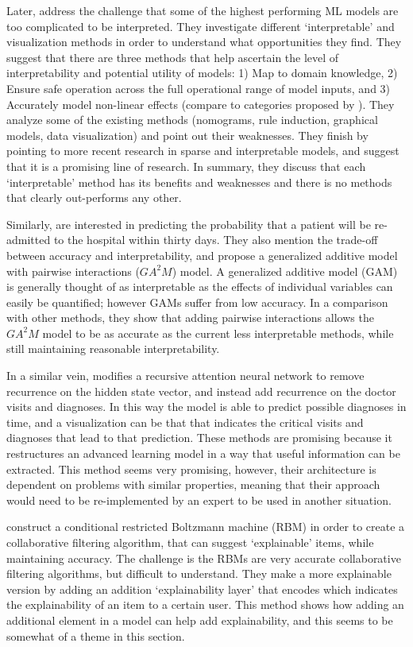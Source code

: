     Later, \citet{Van_Belle2013-ph} address the challenge that some of the highest performing ML models are too complicated to be interpreted. They investigate different `interpretable' and visualization methods in order to understand what opportunities they find. They suggest that there are three methods that help ascertain the level of interpretability and potential utility of models: 1) Map to domain knowledge, 2) Ensure safe operation across the full operational range of model inputs, and 3) Accurately model non-linear effects (compare to categories proposed by \citet{Lipton2016-ug}). They analyze some of the existing methods (nomograms, rule induction, graphical models, data visualization) and point out their weaknesses. They finish by pointing to more recent research in sparse and interpretable models, and suggest that it is a promising line of research. In summary, they discuss that each `interpretable' method has its benefits and weaknesses and there is no methods that clearly out-performs any other.

    Similarly, \citet{Caruana2015-za} are interested in predicting the probability that a patient will be re-admitted to the hospital within thirty days. They also mention the trade-off between accuracy and interpretability, and propose a generalized additive model with pairwise interactions ($GA^2M$) model. A generalized additive model (GAM) is generally thought of as interpretable as the effects of individual variables can easily be quantified; however GAMs suffer from low accuracy. In a comparison with other methods, they show that adding pairwise interactions allows the $GA^2M$ model to be as accurate as the current less interpretable methods, while still maintaining reasonable interpretability.

    In a similar vein, \citet{Choi2016-by} modifies a recursive attention neural network to remove recurrence on the hidden state vector, and instead add recurrence on the doctor visits and diagnoses. In this way the model is able to predict possible diagnoses in time, and a visualization can be that that indicates the critical visits and diagnoses that lead to that prediction. These methods are promising because it restructures an advanced learning model in a way that useful information can be extracted. This method seems very promising, however, their architecture is dependent on problems with similar properties, meaning that their approach would need to be re-implemented by an expert to be used in another situation.

    \citet{Abdollahi2016-vn} construct a conditional restricted Boltzmann machine (RBM) in order to create a collaborative filtering algorithm, that can suggest `explainable' items, while maintaining accuracy. The challenge is the RBMs are very accurate collaborative filtering algorithms, but difficult to understand. They make a more explainable version by adding an addition `explainability layer' that encodes which indicates the explainability of an item to a certain user. This method shows how adding an additional element in a model can help add explainability, and this seems to be somewhat of a theme in this section.

